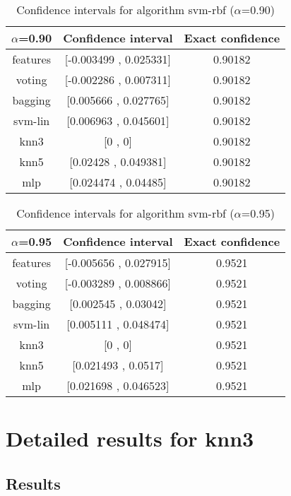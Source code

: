 \documentclass[a4paper,10pt]{article}
\begin{document}
\begin{table}[!htp]
\centering\small
\begin{tabular}{
|c|c|c|}
\hline
 $\alpha$=0.90 & Confidence interval & Exact confidence \\ \hline 
features & [-0.003499 , 0.025331] & 0.90182\\ \hline 
voting & [-0.002286 , 0.007311] & 0.90182\\ \hline 
bagging & [0.005666 , 0.027765] & 0.90182\\ \hline 
svm-lin & [0.006963 , 0.045601] & 0.90182\\ \hline 
knn3 & [0 , 0] & 0.90182\\ \hline 
knn5 & [0.02428 , 0.049381] & 0.90182\\ \hline 
mlp & [0.024474 , 0.04485] & 0.90182\\ \hline 

\end{tabular}
\caption{Confidence intervals for algorithm svm-rbf ($\alpha$=0.90)}
\end{table}
\begin{table}[!htp]
\centering\small
\begin{tabular}{
|c|c|c|}
\hline
 $\alpha$=0.95 & Confidence interval & Exact confidence \\ \hline 
features & [-0.005656 , 0.027915] & 0.9521\\ \hline 
voting & [-0.003289 , 0.008866] & 0.9521\\ \hline 
bagging & [0.002545 , 0.03042] & 0.9521\\ \hline 
svm-lin & [0.005111 , 0.048474] & 0.9521\\ \hline 
knn3 & [0 , 0] & 0.9521\\ \hline 
knn5 & [0.021493 , 0.0517] & 0.9521\\ \hline 
mlp & [0.021698 , 0.046523] & 0.9521\\ \hline 

\end{tabular}
\caption{Confidence intervals for algorithm svm-rbf ($\alpha$=0.95)}
\end{table}

 \clearpage 


\section{Detailed results for knn3}


\subsection{Results}
\end{document}
